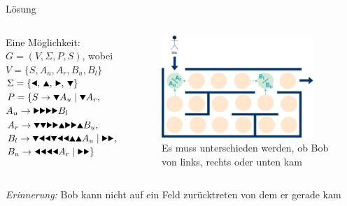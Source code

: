 {
\begin{frame}{Lösung}
    \begin{columns}
    \begin{alertblock}{Eine Möglichkeit:}
         $G = (V, \Sigma, P, S)$, wobei \\
         $V = \{S, A_u, A_r, B_u, B_l\}$ \\
         $\Sigma = \{\text{\Rewind, \MoveUp, \Forward, \MoveDown}\}$ \\
         $P = \{S \rightarrow \text\MoveDown A_u \mid \text\MoveDown A_r,$\\
         \qquad\; $A_u \rightarrow \text{\Forward\Forward\Forward\Forward} B_l$\\
         \qquad\; $A_r \rightarrow \text{\MoveDown\MoveDown\Forward\Forward\MoveUp\Forward\Forward\MoveUp} B_u,$\\
         \qquad\; $B_l \rightarrow \text{\MoveDown\Rewind\Rewind\MoveDown\Rewind\Rewind\MoveUp\MoveUp} A_u \mid \text{\Forward\Forward},$\\
         \qquad\; $B_u \rightarrow \text{\Rewind\Rewind\Rewind\Rewind} A_r \mid \text{\Forward\Forward}\}$
    \end{alertblock}
    \begin{figure}
        \centering
        \includegraphics[width=0.9\textwidth]{../figures/GBeispielHowTo.png}
        \caption{Es muss unterschieden werden, ob Bob von links, rechts oder unten kam}
        
    \end{figure}
    \end{columns}
    \small\emph{Erinnerung:} Bob kann nicht auf ein Feld zurücktreten von dem er gerade kam
\end{frame}
} 

